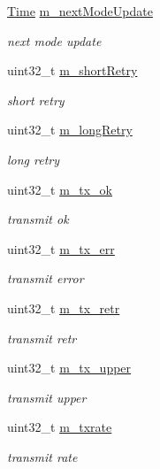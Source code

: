 \begin{DoxyCompactItemize}
\item 
\hyperlink{classns3_1_1Time}{Time} \hyperlink{structns3_1_1OnoeWifiRemoteStation_a99604194d0e8f479bb63ea0835778cdd}{m\+\_\+next\+Mode\+Update}
\begin{DoxyCompactList}\small\item\em next mode update \end{DoxyCompactList}\item 
uint32\+\_\+t \hyperlink{structns3_1_1OnoeWifiRemoteStation_a3b1f73bc2d4309ca82e550b82b43cc41}{m\+\_\+short\+Retry}
\begin{DoxyCompactList}\small\item\em short retry \end{DoxyCompactList}\item 
uint32\+\_\+t \hyperlink{structns3_1_1OnoeWifiRemoteStation_aa6b67257bd42a91946e51ba30540c4ff}{m\+\_\+long\+Retry}
\begin{DoxyCompactList}\small\item\em long retry \end{DoxyCompactList}\item 
uint32\+\_\+t \hyperlink{structns3_1_1OnoeWifiRemoteStation_ab18987f5b2c6046bbf2ec061bc1a2541}{m\+\_\+tx\+\_\+ok}
\begin{DoxyCompactList}\small\item\em transmit ok \end{DoxyCompactList}\item 
uint32\+\_\+t \hyperlink{structns3_1_1OnoeWifiRemoteStation_ac4c720d514c2ff2cfb241bd357fe1c20}{m\+\_\+tx\+\_\+err}
\begin{DoxyCompactList}\small\item\em transmit error \end{DoxyCompactList}\item 
uint32\+\_\+t \hyperlink{structns3_1_1OnoeWifiRemoteStation_a07bc616af518568afe21c07e4704b90c}{m\+\_\+tx\+\_\+retr}
\begin{DoxyCompactList}\small\item\em transmit retr \end{DoxyCompactList}\item 
uint32\+\_\+t \hyperlink{structns3_1_1OnoeWifiRemoteStation_ab8a2a4780aac705a2b7a61689800666b}{m\+\_\+tx\+\_\+upper}
\begin{DoxyCompactList}\small\item\em transmit upper \end{DoxyCompactList}\item 
uint32\+\_\+t \hyperlink{structns3_1_1OnoeWifiRemoteStation_a80cc4cb0e267548b0e21fc9bc5c25321}{m\+\_\+txrate}
\begin{DoxyCompactList}\small\item\em transmit rate \end{DoxyCompactList}\end{DoxyCompactItemize}
